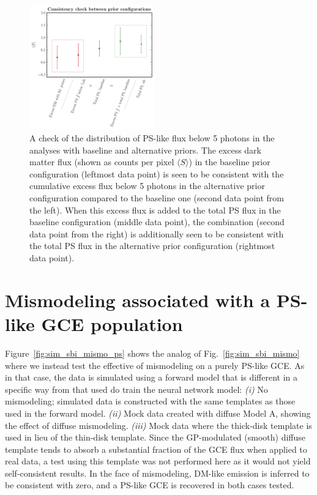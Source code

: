 \documentclass[prd,aps,10pt,nofootinbib,twocolumn,superscriptaddress,preprintnumbers,balancelastpage,longbibliography]{revtex4-1}
\begin{document}
%
\begin{figure}
\centering
\includegraphics[width=0.48\textwidth]{plots/consistency_check.pdf}
\caption{A check of the distribution of PS-like flux below 5 photons in the analyses with baseline and alternative priors. The excess dark matter flux (shown as counts per pixel $\langle S \rangle$) in the baseline prior configuration (leftmost data point) is seen to be consistent with the cumulative excess flux below 5 photons in the alternative prior configuration compared to the baseline one (second data point from the left). When this excess flux is added to the total PS flux in the baseline configuration (middle data point), the combination (second data point from the right) is additionally seen to be consistent with the total PS flux in the alternative prior configuration (rightmost data point).}
\label{fig:consistency}
\end{figure}
%

\section{Mismodeling associated with a PS-like GCE population}
\label{app:mismodeling_ps}

Figure~\ref{fig:sim_sbi_mismo_ps} shows the analog of Fig.~\ref{fig:sim_sbi_mismo} where we instead test the effective of mismodeling on a purely PS-like GCE. As in that case, the data is simulated using a forward model that is different in a specific way from that used do train the neural network model: \emph{(i)} No mismodeling; simulated data is constructed with the same templates as those used in the forward model. \emph{(ii)} Mock data created with diffuse Model A, showing the effect of diffuse mismodeling. \emph{(iii)} Mock data where the thick-disk template is used in lieu of the thin-disk template. Since the GP-modulated (smooth) diffuse template tends to absorb a substantial fraction of the GCE flux when applied to real data, a test using this template was not performed here as it would not yield self-consistent results. In the face of mismodeling, DM-like emission is inferred to be consistent with zero, and a PS-like GCE is recovered in both cases tested.
\end{document}
